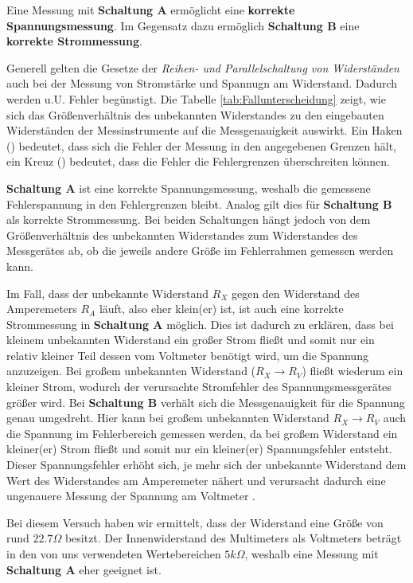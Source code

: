 \documentclass[10pt,a4paper]{article}
\newcommand{\cmark}{\ding{51}}%
\newcommand{\xmark}{\ding{55}}%
\begin{document}

\begin{flushleft}
Eine Messung mit \textbf{Schaltung A} ermöglicht eine \textbf{korrekte Spannungsmessung}. Im Gegensatz dazu ermöglich \textbf{Schaltung B} eine \textbf{korrekte Strommessung}.

Generell gelten die Gesetze der \textit{Reihen- und Parallelschaltung von Widerständen} auch bei der Messung von Stromstärke und Spannugn am Widerstand. Dadurch werden u.U. Fehler begünstigt. Die Tabelle \ref{tab:Fallunterscheidung} zeigt, wie sich das Größenverhältnis des unbekannten Widerstandes zu den eingebauten Widerständen der Messinstrumente auf die Messgenauigkeit auswirkt. Ein Haken (\cmark) bedeutet, dass sich die Fehler der Messung in den angegebenen Grenzen hält, ein Kreuz (\xmark) bedeutet, dass die Fehler die Fehlergrenzen überschreiten können.

\textbf{Schaltung A} ist eine korrekte Spannungsmessung, weshalb die gemessene  Fehlerspannung in den Fehlergrenzen bleibt. Analog gilt dies für \textbf{Schaltung B} als korrekte Strommessung. Bei beiden Schaltungen hängt jedoch von dem Größenverhältnis des unbekannten Widerstandes zum Widerstandes des Messgerätes ab, ob die jeweils andere Größe im Fehlerrahmen gemessen werden kann.

Im Fall, dass der unbekannte Widerstand $R_X$ gegen den Widerstand des Amperemeters $R_A$ läuft, also eher klein(er) ist, ist auch eine korrekte Strommessung in \textbf{Schaltung A} möglich. Dies ist dadurch zu erklären, dass bei kleinem unbekannten Widerstand ein großer Strom fließt und somit nur ein relativ kleiner Teil dessen vom Voltmeter benötigt wird, um die Spannung anzuzeigen. Bei großem unbekannten Widerstand ($R_X \to R_V$) fließt wiederum ein kleiner Strom, wodurch der verursachte Stromfehler des Spannungsmessgerätes größer wird. Bei \textbf{Schaltung B} verhält sich die Messgenauigkeit für die Spannung genau umgedreht. Hier kann bei großem unbekannten Widerstand $R_X \to R_V$ auch die Spannung im Fehlerbereich gemessen werden, da bei großem Widerstand ein kleiner(er) Strom fließt und somit nur ein kleiner(er) Spannungsfehler entsteht. Dieser Spannungsfehler erhöht sich, je mehr sich der unbekannte Widerstand dem Wert des Widerstandes am Amperemeter nähert und verursacht dadurch eine ungenauere Messung der Spannung am Voltmeter \parencite[vgl.][]{SpannStrom}.

Bei diesem Versuch haben wir ermittelt, dass der Widerstand eine Größe von rund $22.7 \Omega$ besitzt. Der Innenwiderstand des Multimeters als Voltmeters beträgt in den von uns verwendeten Wertebereichen $5k\Omega$, weshalb eine Messung mit \textbf{Schaltung A} eher geeignet ist.
\end{flushleft}
\end{document}
